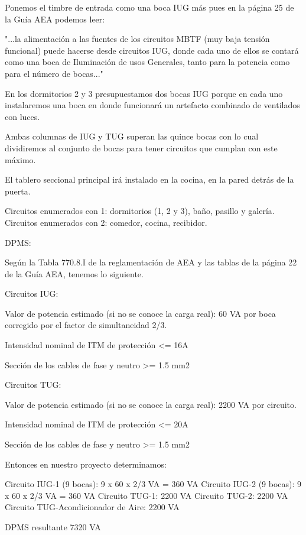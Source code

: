 Ponemos el timbre de entrada como una boca IUG más pues en la página 25 de la Guía AEA
podemos leer:

		"...la alimentación a las fuentes de los circuitos MBTF (muy baja tensión
		funcional) puede hacerse desde circuitos IUG, donde cada uno de ellos se 
		contará como una boca de Iluminación de usos Generales, tanto para la 
		potencia como para el número de bocas..."


En los dormitorios 2 y 3 presupuestamos dos bocas IUG porque en cada uno
instalaremos una boca en donde funcionará un artefacto combinado de 
ventilados con luces.


Ambas columnas de IUG y TUG superan las quince bocas con lo cual
dividiremos al conjunto de bocas para tener circuitos que cumplan
con este máximo.


El tablero seccional principal irá instalado en la cocina, en la pared
detrás de la puerta.

Circuitos enumerados con 1: dormitorios (1, 2 y 3), baño, pasillo y galería.
Circuitos enumerados con 2: comedor, cocina, recibidor.


DPMS:

Según la Tabla 770.8.I de la reglamentación de AEA y las tablas de la página
22 de la Guía AEA, tenemos lo siguiente.

Circuitos IUG:

Valor de potencia estimado (si no se conoce la carga real): 60 VA por boca
corregido por el factor de simultaneidad 2/3.

Intensidad nominal de ITM de protección <= 16A

Sección de los cables de fase y neutro >= 1.5 mm2

Circuitos TUG:

Valor de potencia estimado (si no se conoce la carga real): 2200 VA por circuito.

Intensidad nominal de ITM de protección <= 20A

Sección de los cables de fase y neutro >= 1.5 mm2



Entonces en nuestro proyecto determinamos:

Circuito IUG-1 (9 bocas): 9 x 60 x 2/3 VA = 360 VA 
Circuito IUG-2 (9 bocas): 9 x 60 x 2/3 VA = 360 VA
Circuito TUG-1:                            2200 VA
Circuito TUG-2:                            2200 VA
Circuito TUG-Acondicionador de Aire:       2200 VA  

DPMS resultante                            7320 VA

